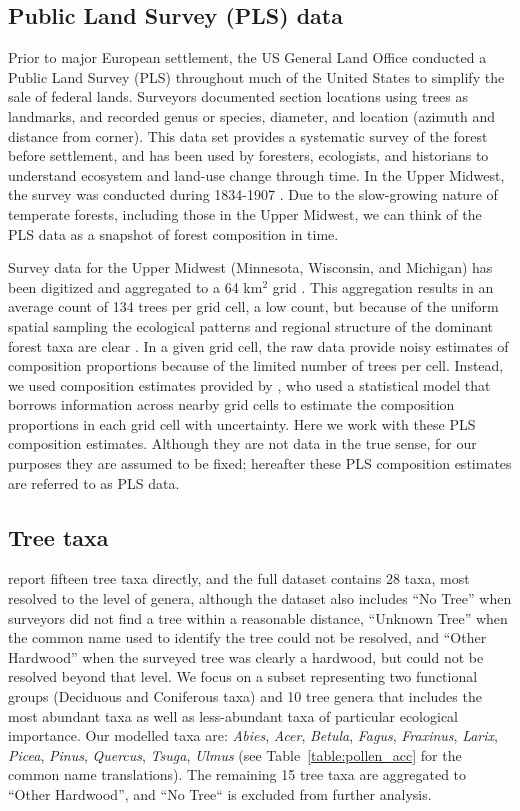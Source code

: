 \documentclass[12pt]{article}
\begin{document}
\subsection{Public Land Survey (PLS) data}
Prior to major European settlement, the US General Land Office
conducted a Public Land Survey (PLS) throughout much of the United
States to simplify the sale of federal lands. Surveyors documented
section locations using trees as landmarks, and recorded genus or
species, diameter, and location (azimuth and distance from
corner). This data set provides a systematic survey of the forest
before settlement, and has been used by foresters, ecologists, and
historians to understand ecosystem and land-use change through
time. In the Upper Midwest, the survey was conducted during 1834-1907
\citep{stewart1935public}. Due to the slow-growing nature of temperate
forests, including those in the Upper Midwest, we can think of the PLS
data as a snapshot of forest composition in time.

Survey data for the Upper Midwest (Minnesota, Wisconsin, and Michigan)
has been digitized and aggregated to a 64 km$^2$ grid
\citep{goring_witness}. This aggregation results in an average count
of 134 trees per grid cell, a low count, but because of the uniform
spatial sampling the ecological patterns and regional structure of the
dominant forest taxa are clear \citep{goring_witness}. In a given grid
cell, the raw data provide noisy estimates of composition proportions
because of the limited number of trees per cell. Instead, we used
composition estimates provided by \citet{paciorek2015}, who used a
statistical model that borrows information across nearby grid cells to
estimate the composition proportions in each grid cell with
uncertainty. Here we work with these PLS composition
estimates. Although they are not data in the true sense, for our
purposes they are assumed to be fixed; hereafter these PLS composition
estimates are referred to as PLS data.

\subsection{Tree taxa}

\citet{goring_witness} report fifteen tree taxa directly, and the full
dataset contains 28 taxa, most resolved to the level of genera,
although the dataset also includes ``No Tree'' when surveyors did not
find a tree within a reasonable distance, ``Unknown Tree'' when the
common name used to identify the tree could not be resolved, and
``Other Hardwood'' when the surveyed tree was clearly a hardwood, but
could not be resolved beyond that level. We focus on a subset
representing two functional groups (Deciduous and Coniferous taxa) and
10 tree genera that includes the most abundant taxa as well as
less-abundant taxa of particular ecological importance. Our modelled
taxa are: \textit{Abies}, \textit{Acer}, \textit{Betula},
\textit{Fagus}, \textit{Fraxinus}, \textit{Larix}, \textit{Picea},
\textit{Pinus}, \textit{Quercus}, \textit{Tsuga}, \textit{Ulmus} (see
Table~\ref{table:pollen_acc} for the common name translations). The
remaining 15 tree taxa are aggregated to ``Other Hardwood'', and ``No
Tree`` is excluded from further analysis. 
\end{document}
